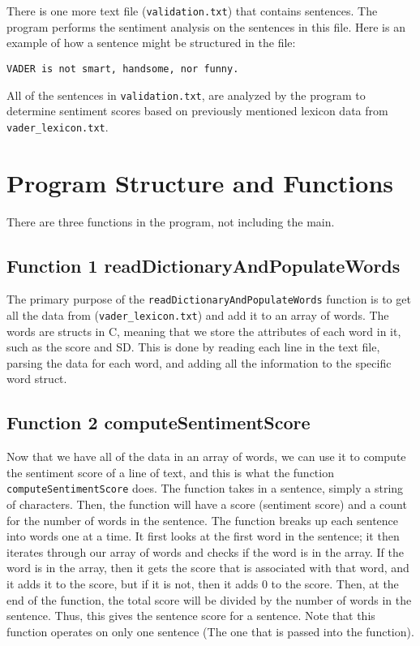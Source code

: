 \documentclass[a4paper]{article}
\begin{document}
There is one more text file (\texttt{validation.txt}) that contains sentences. The program performs the sentiment analysis on the sentences in this file. Here is an example of how a sentence might be structured in the file:

\begin{verbatim}
VADER is not smart, handsome, nor funny.
\end{verbatim}

All of the sentences in \texttt{validation.txt}, are analyzed by the program to determine sentiment scores based on previously mentioned lexicon data from \texttt{vader\_lexicon.txt}.


\section{Program Structure and Functions}

There are three functions in the program, not including the main.
\subsection{Function 1 readDictionaryAndPopulateWords}
The primary purpose of the \texttt{readDictionaryAndPopulateWords} function is to get all the data from (\texttt{vader\_lexicon.txt}) and add it to an array of words. The words are structs in C, meaning that we store the attributes of each word in it, such as the score and SD. This is done by reading each line in the text file, parsing the data for each word, and adding all the information to the specific word struct.

\subsection{Function 2 computeSentimentScore}

Now that we have all of the data in an array of words, we can use it to compute the sentiment score of a line of text, and this is what the function \texttt{computeSentimentScore} does. The function takes in a sentence, simply a string of characters. Then, the function will have a score (sentiment score) and a count for the number of words in the sentence. The function breaks up each sentence into words one at a time. It first looks at the first word in the sentence; it then iterates through our array of words and checks if the word is in the array. If the word is in the array, then it gets the score that is associated with that word, and it adds it to the score, but if it is not, then it adds 0 to the score. Then, at the end of the function, the total score will be divided by the number of words in the sentence. Thus, this gives the sentence score for a sentence. Note that this function operates on only one sentence (The one that is passed into the function).  
\end{document}
